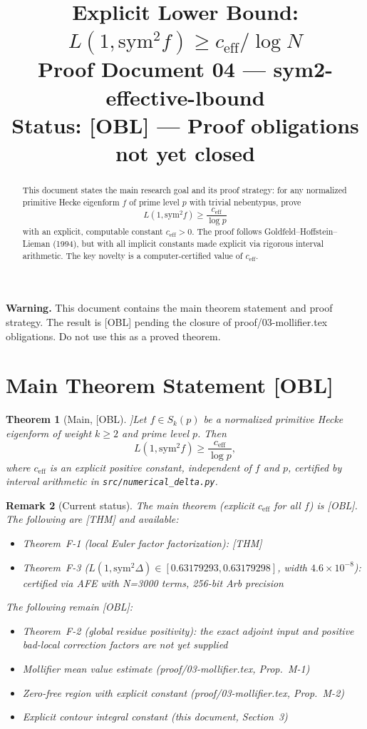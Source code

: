 \documentclass[12pt]{article}
\title{Explicit Lower Bound: $L(1, \mathrm{sym}^2 f) \geq c_{\mathrm{eff}}/\log N$\\
\large Proof Document 04 --- sym2-effective-lbound\\
\normalsize \textbf{Status: [OBL] --- Proof obligations not yet closed}}
\author{}
\date{}
\newtheorem{theorem}{Theorem}[section]
\newtheorem{remark}[theorem]{Remark}
\begin{document}
\maketitle

\noindent\textbf{Warning.}  This document contains the main theorem statement and
proof strategy.  The result is [OBL] pending the closure of proof/03-mollifier.tex
obligations.  Do not use this as a proved theorem.

\begin{abstract}
This document states the main research goal and its proof strategy:
for any normalized primitive Hecke eigenform $f$ of prime level $p$ with trivial
nebentypus, prove
\[
  L(1, \mathrm{sym}^2 f) \geq \frac{c_{\mathrm{eff}}}{\log p}
\]
with an explicit, computable constant $c_{\mathrm{eff}} > 0$.
The proof follows Goldfeld--Hoffstein--Lieman (1994), but with all implicit constants
made explicit via rigorous interval arithmetic.  The key novelty is a computer-certified
value of $c_{\mathrm{eff}}$.
\end{abstract}

\tableofcontents

\section{Main Theorem Statement [OBL]}

\begin{theorem}[Main, [OBL]]\label{thm:main}
Let $f \in S_k(p)$ be a normalized primitive Hecke eigenform of weight $k \geq 2$
and prime level $p$.  Then
\[
  L(1, \mathrm{sym}^2 f) \geq \frac{c_{\mathrm{eff}}}{\log p},
\]
where $c_{\mathrm{eff}}$ is an explicit positive constant, independent of $f$ and $p$,
certified by interval arithmetic in \texttt{src/numerical\_delta.py}.
\end{theorem}

\begin{remark}[Current status]
The main theorem (explicit $c_{\mathrm{eff}}$ for all $f$) is [OBL].
The following are [THM] and available:
\begin{itemize}
  \item Theorem~F-1 (local Euler factor factorization): [THM]
  \item Theorem~F-3 ($L(1, \mathrm{sym}^2 \Delta) \in [0.63179293, 0.63179298]$, width $4.6 \times 10^{-8}$):
        certified via AFE with N=3000 terms, 256-bit Arb precision
\end{itemize}
The following remain [OBL]:
\begin{itemize}
  \item Theorem~F-2 (global residue positivity): the exact adjoint input and
        positive bad-local correction factors are not yet supplied
  \item Mollifier mean value estimate (proof/03-mollifier.tex, Prop.~M-1)
  \item Zero-free region with explicit constant (proof/03-mollifier.tex, Prop.~M-2)
  \item Explicit contour integral constant (this document, Section~3)
\end{itemize}
\end{remark}
\end{document}
